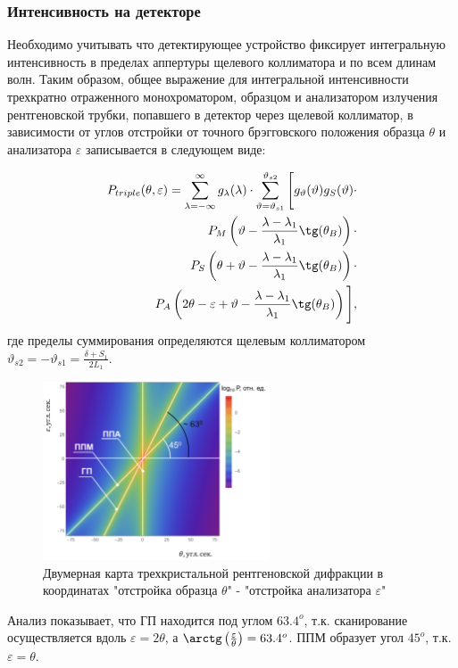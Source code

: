 \subsubsection*{Интенсивность на детекторе}

Необходимо учитывать что детектирующее устройство фиксирует интегральную интенсивность в пределах аппертуры
щелевого коллиматора и по всем длинам волн.
Таким образом, общее выражение для интегральной интенсивности трехкратно отраженного
монохроматором, образцом и анализатором излучения рентгеновской трубки, попавшего в детектор через
щелевой коллиматор, в зависимости от углов отстройки от точного брэгговского положения образца $\theta$ и
анализатора $\varepsilon$ записывается в следующем виде:

\begin{eqnarray} \label{eq:doudle_spectra_angle}
  P_{triple}(\theta,\varepsilon) = \sum_{\lambda = -\infty}^{\infty}g_{\lambda}(\lambda)\cdot
  \sum_{\vartheta = \vartheta_{s1}}^{\vartheta_{s2}} \Bigg[ g_{\vartheta}(\vartheta) g_{S}(\vartheta) \cdot \nonumber \\
    P_M \left(\vartheta - \frac{\lambda - \lambda_1}{\lambda_1}\tg(\theta_B) \right) \cdot \nonumber \\
   P_S \left(\theta + \vartheta - \frac{\lambda - \lambda_1}{\lambda_1}\tg(\theta_B)\right)  \cdot  \nonumber \\
   P_A \left(2\theta - \varepsilon + \vartheta - \frac{\lambda - \lambda_1}{\lambda_1}\tg(\theta_B)\right) \Bigg],
 \end{eqnarray}
 \noindent
где пределы суммирования определяются щелевым коллиматором $\vartheta_{s2} = - \vartheta_{s1} = \frac{\delta+S_1}{2L_1}$.
 \begin{figure}[H]
   \centering
   \includegraphics[width=0.6\textwidth]{images/triple_map_direct_space.png}
   \caption{Двумерная карта трехкристальной рентгеновской дифракции
   в координатах "отстройка образца $\theta$" -  "отстройка анализатора $\varepsilon$"}
   \label{ris:triple_map_direct_space}
 \end{figure}

Анализ показывает, что ГП находится под углом $63.4^o$, т.к. сканирование осуществляется вдоль $\varepsilon = 2 \theta$,
а $ \arctg \left(\frac{\varepsilon}{\theta} \right) = 63.4^o$. ППМ образует угол $45^o$, т.к. $\varepsilon = \theta$.
